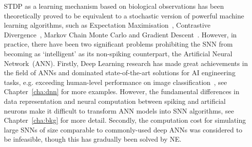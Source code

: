 \documentclass[10pt,journal,compsoc]{IEEEtran}
\begin{document}
STDP as a learning mechanism based on biological observations has been theoretically proved to be equivalent to a stochastic version of powerful machine learning algorithms, such as Expectation Maximisation~\cite{nessler2013bayesian}, Contrastive Divergence~\cite{neftci2013event}, Markov Chain Monte Carlo \cite{buesing2011neural} and Gradient Descent~\cite{o2016deep}.
However, in practice, there have been two significant problems prohibiting the SNN from becoming as `intelligent' as its non-spiking counterpart, the Artificial Neural Network~(ANN).
Firstly, Deep Learning research has made great achievements in the field of ANNs and dominated state-of-the-art solutions for AI engineering tasks, e.g. exceeding human-level performance on image classification~\cite{he2015delving}, see Chapter~\ref{cha:dnn} for more examples.
However, the fundamental differences in data representation and neural computation between spiking and artificial neurons make it difficult to transform ANN models into SNN algorithms, see Chapter~\ref{cha:bkg} for more detail.
Secondly, the computation cost for simulating large SNNs of size comparable to commonly-used deep ANNs was considered to be infeasible, though this has gradually been solved by NE.
\end{document}
